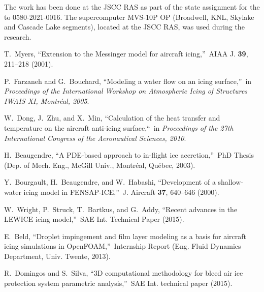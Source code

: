 \documentclass[
11pt,%
tightenlines,%
twoside,%
onecolumn,%
nofloats,%
nobibnotes,%
nofootinbib,%
superscriptaddress,%
noshowpacs,%
centertags]%
{revtex4}
\begin{document}
\begin{acknowledgments}
The work has been done at the JSCC RAS as part of the state assignment for the to 0580-2021-0016.
The supercomputer MVS-10P OP (Broadwell, KNL, Skylake and Cascade Lake segments), located at the JSCC RAS, was used during the research.
\end{acknowledgments}

\begin{thebibliography}{99}


T.~Myers, \textquotedblleft Extension to the Messinger model for aircraft icing,\textquotedblright \ AIAA J. \textbf{39}, 211--218 (2001).

P.~Farzaneh and G.~Bouchard, \textquotedblleft Modeling a water flow on an icing surface,\textquotedblright \ in \textit{Proceedings of the International Workshop on Atmospheric Icing of Structures IWAIS XI, Montr\'eal, 2005}.

W.~Dong, J.~Zhu, and X.~Min, \textquotedblleft Calculation of the heat transfer and temperature on the aircraft anti-icing surface,\textquotedblleft \ in \textit{Proceedings of the 27th International Congress of the Aeronautical Sciences, 2010}.

H.~Beaugendre, \textquotedblleft A PDE-based approach to in-flight ice accretion,\textquotedblright \ PhD Thesis (Dep. of Mech. Eng., McGill Univ., Montr\'eal, Qu\'ebec, 2003).


Y.~Bourgault, H.~Beaugendre, and W.~Habashi, \textquotedblleft Development of a shallow-water icing model in FENSAP-ICE,\textquotedblright \ J. Aircraft \textbf{37}, 640--646 (2000).

W.~Wright, P.~Struck, T.~Bartkus, and G.~Addy, \textquotedblleft Recent advances in the LEWICE icing model,\textquotedblright \ SAE Int. Technical Paper (2015).

E.~Beld, \textquotedblleft Droplet impingement and film layer modeling as a basis for aircraft icing simulations in OpenFOAM,\textquotedblright \ Internship Report (Eng. Fluid Dynamics Department, Univ. Twente, 2013).

R.~Domingos and S.~Silva, \textquotedblleft 3D computational methodology for bleed air ice protection system parametric analysis,\textquotedblright \ SAE Int. technical paper (2015).


\end{thebibliography}
\end{document}

